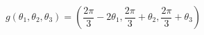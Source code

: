 \begin{equation}
g(\theta_1, \theta_2,\theta_3) =(\frac{2\pi}{3}-2\theta_1,\frac{2\pi}{3}+\theta_2,
\frac{2\pi}{3}+\theta_3)
\end{equation}

